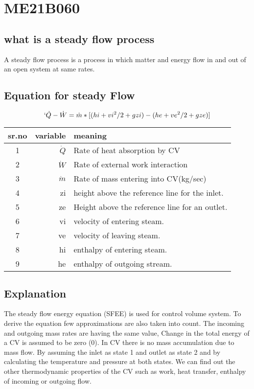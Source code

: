 \section{ME21B060}
\subsection{what is a steady flow process}
A steady flow process is a process in which matter and energy flow in and out of an open system at same rates.
\subsection{Equation for steady Flow}
\begin{equation}`
 \dot Q-\dot W = \dot m *[(hi+vi^2/2+gzi)-( he+ve^2/2+gze)]
\end{equation}
\begin{tabular}{|c|r|l|}
\hline
sr.no & variable & meaning \\
\hline 
1 & $\dot Q$ & Rate of heat absorption by CV \\
2 & $\dot W$ & Rate of external work interaction \\
3 & $\dot m$ & Rate of mass entering into CV(kg/sec)\\
4 & zi & height above the reference line for the inlet.\\
5 & ze & Height above the reference line for an outlet.\\
6 & vi & velocity of entering steam.\\
7 & ve & velocity of leaving steam.\\
8 & hi & enthalpy of entering steam.\\
9 & he & enthalpy of outgoing stream. \\
\hline
\end{tabular}
\subsection{Explanation}
The steady flow energy equation (SFEE) is used for control volume system. To derive the equation few approximations are also taken into count. The incoming and outgoing mass rates are having the same value, Change in the total energy of a CV is assumed to be zero (0). In CV there is no mass accumulation due to mass flow. By assuming the inlet as state 1 and outlet as state 2 and by calculating the temperature and pressure at both states. We can find out the other thermodynamic properties of the CV such as work, heat transfer, enthalpy of incoming or outgoing flow.
